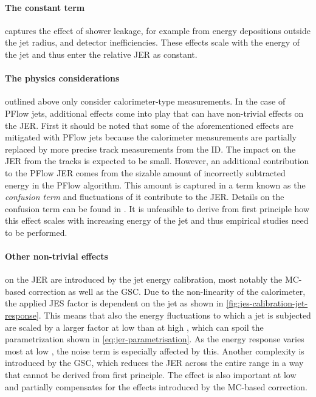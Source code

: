 \paragraph{The constant term} captures the effect of shower leakage, for example from energy depositions outside the jet radius, and detector inefficiencies. These effects scale with the energy of the jet and thus enter the relative JER as constant.

\paragraph{The physics considerations} outlined above only consider calorimeter-type measurements.
In the case of PFlow jets, additional effects come into play that can have non-trivial effects on the JER.
First it should be noted that some of the aforementioned effects are mitigated with PFlow jets because the calorimeter measurements are partially replaced by more precise track measurements from the ID. 
The impact on the JER from the tracks is expected to be small.
However, an additional contribution to the PFlow JER comes from the sizable amount of incorrectly subtracted energy in the PFlow algorithm.
This amount is captured in a term known as the \emph{confusion term} and fluctuations of it contribute to the JER. Details on the confusion term can be found in . It is unfeasible to derive from first principle how this effect scales with increasing energy of the jet and thus empirical studies need to be performed.

\paragraph{Other non-trivial effects} on the JER are introduced by the jet energy calibration, most notably the MC-based correction as well as the GSC.
Due to the non-linearity of the calorimeter, the applied JES factor is dependent on the jet \pT as shown in \cref{fig:jes-calibration-jet-response}. This means that also the energy fluctuations to which a jet is subjected are scaled by a larger factor at low \pT than at high \pT, which can spoil the parametrization shown in \cref{eq:jer-parametrisation}.
As the energy response varies most at low \pT, the noise term is especially affected by this.
Another complexity is introduced by the GSC, which reduces the JER across the entire \pT range in a way that cannot be derived from first principle. The effect is also important at low \pT and partially compensates for the effects introduced by the MC-based correction.

